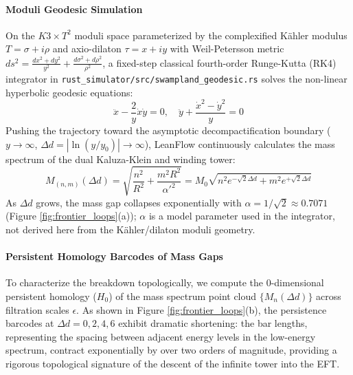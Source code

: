 \documentclass[11pt,a4paper]{article}
\newcommand{\numreconcile}[2]{#1}
\begin{document}
\paragraph{Moduli Geodesic Simulation}
On the $K3 \times T^2$ moduli space parameterized by the complexified K\"ahler modulus $T = \sigma + i \rho$ and axio-dilaton $\tau = x + i y$ with Weil-Petersson metric $ds^2 = \frac{dx^2 + dy^2}{y^2} + \frac{d\sigma^2 + d\rho^2}{\rho^2}$, a fixed-step classical fourth-order Runge-Kutta (RK4) integrator in \texttt{rust\_simulator/src/swampland\_geodesic.rs} solves the non-linear hyperbolic geodesic equations:
\begin{equation}
\ddot{x} - \frac{2}{y}\dot{x}\dot{y} = 0, \quad \ddot{y} + \frac{\dot{x}^2 - \dot{y}^2}{y} = 0
\end{equation}
Pushing the trajectory toward the asymptotic decompactification boundary ($y \to \infty$, $\Delta d = |\ln(y/y_0)| \to \infty$), LeanFlow continuously calculates the mass spectrum of the dual Kaluza-Klein and winding tower:
\begin{equation}
M_{(n, m)}(\Delta d) = \sqrt{\frac{n^2}{R^2} + \frac{m^2 R^2}{\alpha'^2}} = M_0 \sqrt{n^2 e^{-\sqrt{2}\Delta d} + m^2 e^{+\sqrt{2}\Delta d}}
\end{equation}
As $\Delta d$ grows, the mass gap collapses exponentially with $\alpha = 1/\sqrt{2} \approx \numreconcile{0.7071}{SDC exponent}$ (Figure \ref{fig:frontier_loops}(a)); $\alpha$ is a model parameter used in the integrator, not derived here from the K\"ahler/dilaton moduli geometry.

\paragraph{Persistent Homology Barcodes of Mass Gaps}
To characterize the breakdown topologically, we compute the 0-dimensional persistent homology ($H_0$) of the mass spectrum point cloud $\{M_n(\Delta d)\}$ across filtration scales $\epsilon$. As shown in Figure \ref{fig:frontier_loops}(b), the persistence barcodes at $\Delta d = 0, 2, 4, 6$ exhibit dramatic shortening: the bar lengths, representing the spacing between adjacent energy levels in the low-energy spectrum, contract exponentially by over two orders of magnitude, providing a rigorous topological signature of the descent of the infinite tower into the EFT.
\end{document}
